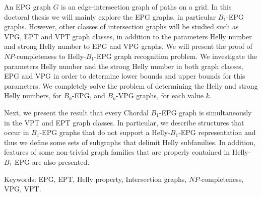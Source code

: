 \begin{foreignabstract}
An EPG graph  $G$  is an edge-intersection graph of paths on a grid. 
In this doctoral thesis we will mainly explore the  EPG graphs, in particular $B_1$-EPG graphs. However, other classes of intersection graphs will be studied such as VPG, EPT and VPT graph classes, in addition to the parameters Helly number and strong Helly number to EPG and VPG graphs. We will present the proof of $NP$-completeness to Helly-$B_1$-EPG graph recognition problem. We investigate the parameters Helly number and the strong Helly number in both graph classes, EPG and VPG in order to determine lower bounds and upper bounds for this parameters. We completely solve the problem of determining the Helly and strong Helly numbers, for $B_k$-EPG, and $B_k$-VPG graphs, for each value $k$. 

Next, we present the result that every Chordal $B_1$-EPG graph is simultaneously in the VPT and EPT graph classes. In particular, we describe structures that occur in  $ B_1$-EPG graphs that do not support a Helly-$B_1$-EPG representation and thus we define some sets of subgraphs that delimit Helly subfamilies. 
 In addition, features of some non-trivial graph families that are properly contained in Helly-$B_1$ EPG are also presented.

Keywords: EPG, EPT, Helly property, Intersection graphs, $NP$-completeness, VPG, VPT.

\end{foreignabstract}

